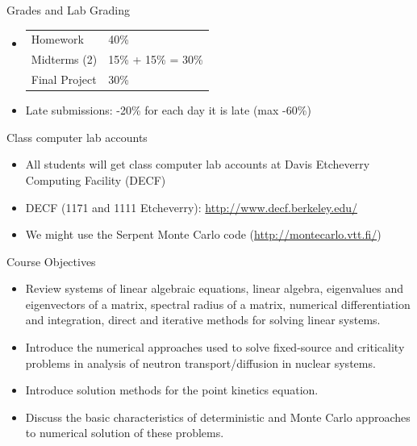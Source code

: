 \documentclass[xcolor=x11names,compress]{beamer}
\renewcommand{\(}{\begin{columns}}
\renewcommand{\)}{\end{columns}}
\newcommand{\<}[1]{\begin{column}{#1}}
\renewcommand{\>}{\end{column}}
\begin{document}
\begin{frame}{Grades and Lab}
Grading
\begin{itemize}
\item \begin{tabular}{ll}
Homework & 40\% \\
Midterms (2) & 15\% + 15\% = 30\% \\
Final Project & 30\% 
\end{tabular}
\item Late submissions: -20\% for each day it is late (max -60\%)
\end{itemize}
Class computer lab accounts
\begin{itemize}
\item All students will get class computer lab accounts at Davis Etcheverry Computing Facility (DECF)
\item DECF (1171 and 1111 Etcheverry): \href{http://www.decf.berkeley.edu/}{http://www.decf.berkeley.edu/}
\item We might use the Serpent Monte Carlo code (\href{http://montecarlo.vtt.fi/}{http://montecarlo.vtt.fi/})
\end{itemize}
\end{frame}

\begin{frame}{Course Objectives}
\begin{itemize}
\item Review systems of linear algebraic equations, linear algebra, eigenvalues and eigenvectors of a matrix, spectral radius of a matrix, numerical differentiation and integration, direct and iterative methods for solving linear systems.
\item Introduce the numerical approaches used to solve fixed-source and criticality problems in analysis of neutron transport/diffusion in nuclear systems.
\item Introduce solution methods for the point kinetics equation.
\item Discuss the basic characteristics of deterministic and Monte Carlo approaches to numerical solution of these problems.
\end{itemize}
\end{frame}
\end{document}
